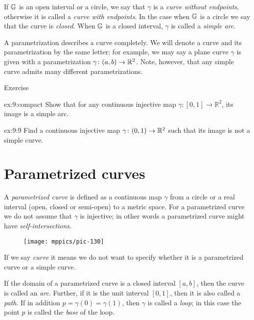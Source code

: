 If $\mathbb{G}$ is an open interval or a circle, we say that $\gamma$ is a \emph{curve without endpoints}, otherwise it is 
called a {}\emph{curve with endpoints}.
In the case when $\mathbb{G}$ is a circle we say that the curve is \emph{closed}. 
When $\mathbb{G}$ is a closed interval, $\gamma$ is called a \emph{simple arc}.


A parametrization describes a curve completely.
We will denote a curve and its parametrization by the same letter;
for example, we may say a plane curve $\gamma$ is given with a parametrization $\gamma\:(a,b)\z\to \RR^2$.
Note, however, that any simple curve admits many different parametrizations. 

\begin{thm}{Exercise}\label{ex:9}

\begin{subthm}{ex:9:compact}
Show that for any continuous injective map $\gamma : [0,1]\to \mathbb{R}^2$, its image is a simple arc.
\end{subthm}

\begin{subthm}{ex:9:9}
Find a continuous injective map $\gamma\colon(0,1)\to\mathbb{R}^2$ such that its image is not a simple curve.
\end{subthm}

\end{thm}


\section{Parametrized curves}

A \emph{parametrized curve} is defined as a continuous map $\gamma$ from a circle or a real interval (open, closed or semi-open) to a metric space. 
For a parametrized curve we do not assume that $\gamma$ is injective; in other words a parametrized curve might have \emph{self-intersections}.

\begin{wrapfigure}{o}{17 mm}
\vskip-3mm
\centering
\texttt{[image: mppics/pic-130]}
\end{wrapfigure}

If we say \emph{curve} it means we do not want to specify whether it is a parametrized curve or a simple curve.

If the domain of a parametrized curve is a closed interval $[a,b]$, then the curve is called an \emph{arc}.
Further, if it is the unit interval $[0,1]$, then it is also called a \emph{path}.
If in addition $p=\gamma(0)=\gamma(1)$, then $\gamma$ is called a \emph{loop};
in this case the point $p$ is called the \emph{base} of the loop.

